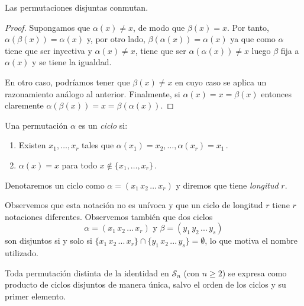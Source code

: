 \begin{nprop} 
Las permutaciones disjuntas conmutan.
\end{nprop}
\begin{proof}
Supongamos que $	\alpha(x) \neq x$, de modo que $\beta(x) = x$. Por tanto, $\alpha(\beta(x)) = \alpha(x)$ y, por otro lado, $\beta(\alpha(x)) = \alpha(x)$ ya que como $\alpha$ tiene que ser inyectiva y $\alpha(x) \neq x$, tiene que ser $\alpha(\alpha(x)) \neq x$ luego $\beta$ fija a $\alpha(x)$ y se tiene la igualdad.

En otro caso, podríamos tener que $\beta(x) \neq x$ en cuyo caso se aplica un razonamiento análogo al anterior. Finalmente, si $\alpha(x) = x = \beta(x)$ entonces claremente $\alpha(\beta(x)) = x = \beta(\alpha(x))$.
\end{proof}

\begin{ndef}[Ciclo]

Una permutación $\alpha$ es un \textit{ciclo} si: \begin{enumerate}
  \item Existen $x_1, \hdots, x_r$ tales que $\alpha(x_1) = x_2, \hdots, \alpha(x_r) = x_1$\,.
  \item $\alpha(x) = x$ para todo $x \notin \{x_1,\hdots,x_r\}$\,.
\end{enumerate}

Denotaremos un ciclo como  $\alpha = (x_1 \, x_2 \, \hdots \, x_r)$ y diremos que tiene \textit{longitud} $r$.
\end{ndef}

Observemos que esta notación no es unívoca y que un ciclo de longitud $r$ tiene $r$ notaciones diferentes. Observemos también que dos ciclos \begin{equation*}
  \alpha = (x_1 \, x_2 \, ... \, x_r) \text{ y } \beta = (y_1 \, y_2 \, ... \, y_s)
\end{equation*}son disjuntos si y solo si $\{x_1 \, x_2 \, ... \, x_r \} \cap \{y_1 \, x_2 \, ... \, y_s \} = \emptyset$, lo que motiva el nombre utilizado.

\begin{nth}
Toda permutación distinta de la identidad en $\mathcal S_n$ (con $n \ge 2$) se expresa como producto de ciclos disjuntos de manera única, salvo el orden de los ciclos y su primer elemento.
\end{nth}


